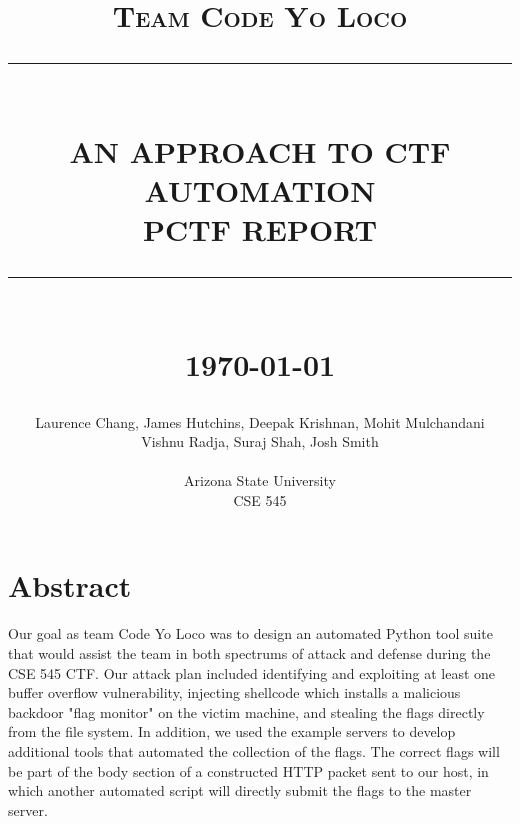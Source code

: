 \documentclass[12pt]{report}
\newcommand{\HRule}[1]{\rule{\linewidth}{#1}}
\begin{document}
\title{ \normalsize \textsc{Team Code Yo Loco}
		\\ [2.0cm]
		\HRule{0.5pt} \\
		\LARGE \textbf{\uppercase{An Approach to CTF Automation \\ PCTF Report}}
		\HRule{2pt} \\ [0.5cm]
		\normalsize \today \vspace*{5\baselineskip}}

\date{}

\author{Laurence Chang, James Hutchins, Deepak Krishnan, Mohit Mulchandani
		\\ Vishnu Radja, Suraj Shah, Josh Smith \\ \\ 
		Arizona State University \\
		CSE 545 }

\maketitle
\tableofcontents
\newpage

\sectionfont{\scshape}

\section*{Abstract}
Our goal as team Code Yo Loco was to design an automated Python tool suite that would assist the team in both spectrums of attack and defense during the CSE 545 CTF. Our attack plan included identifying and exploiting at least one buffer overflow vulnerability, injecting shellcode which installs a malicious backdoor "flag monitor" on the victim machine, and stealing the flags directly from the file system. In addition, we used the example servers to develop additional tools that automated the collection of the flags. The correct flags will be part of the body section of a constructed HTTP packet sent to our host, in which another automated script will directly submit the flags to the master server. 

\end{document}
